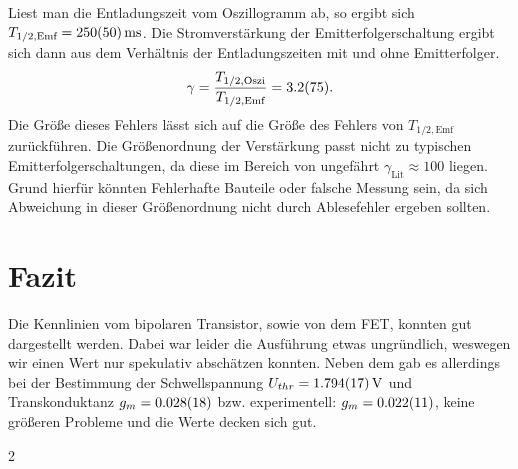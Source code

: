 \documentclass[10pt]{article}
\newenvironment{Figure}
  {\par\medskip\noindent\minipage{\linewidth}}
  {\endminipage\par\medskip}
\begin{document}
\begin{multicols}{2}
\begin{Figure}
	\end{Figure}
	Liest man die Entladungszeit vom Oszillogramm ab, so ergibt sich $T_{1/2,\text{Emf}}=\SI{250+-50}{\milli s}$.
	Die Stromverstärkung der Emitterfolgerschaltung ergibt sich dann aus dem Verhältnis der Entladungszeiten mit und ohne Emitterfolger.
	\begin{align}
		\gamma =\dfrac{T_{1/2,\text{Oszi}}}{T_{1/2,\text{Emf}}}=\SI{3.2+-7.5}{}
		.\end{align}
	Die Größe dieses Fehlers lässt sich auf die Größe des Fehlers von $T_{1/2,\text{Emf}}$ zurückführen.
	Die Größenordnung der Verstärkung passt nicht zu typischen Emitterfolgerschaltungen, da diese im Bereich von ungefährt $\gamma _{\text{Lit}}\approx 100$ liegen.
	Grund hierfür könnten Fehlerhafte Bauteile oder falsche Messung sein, da sich Abweichung in dieser Größenordnung nicht durch Ablesefehler ergeben sollten.

	\section{Fazit}
	Die Kennlinien vom bipolaren Transistor, sowie von dem FET, konnten gut dargestellt werden. Dabei war leider die Ausführung etwas ungründlich, weswegen wir einen Wert nur spekulativ abschätzen konnten. Neben dem gab es allerdings bei der Bestimmung der Schwellspannung $U_{thr}=\SI{1.794+-0.017}{V}$ und Transkonduktanz $g_m=\SI{0.028+-0.018}{}$ bzw. experimentell: $g_m=\SI{0.022+-0.011}{}$, keine größeren Probleme und die Werte decken sich gut.

\end{multicols}{2}
\clearpage
\listoffigures
\listoftables



\end{document}
